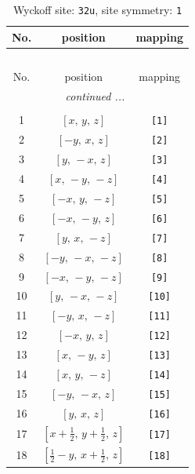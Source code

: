 \documentclass[fleqn,8pt]{jsarticle}
\begin{document}
\renewcommand{\arraystretch}{1.2}
\begin{longtable}{ccc}
\caption{Wyckoff site: {\tt 32u}, site symmetry: {\tt 1}}
 \\
 \hline \hline
No. & position & mapping \\ \hline \endfirsthead

\multicolumn{2}{l}{\tablename\ \thetable{}} \\
 \hline \hline
No. & position & mapping \\ \hline \endhead

 \hline \hline
\multicolumn{2}{r}{\footnotesize\it continued ...} \\ \endfoot

 \hline \hline
\multicolumn{2}{r}{} \\ \endlastfoot

1 & $\left[ x,\, y,\, z \right]$ & {\tt [1]} \\ \hline
2 & $\left[ - y,\, x,\, z \right]$ & {\tt [2]} \\ \hline
3 & $\left[ y,\, - x,\, z \right]$ & {\tt [3]} \\ \hline
4 & $\left[ x,\, - y,\, - z \right]$ & {\tt [4]} \\ \hline
5 & $\left[ - x,\, y,\, - z \right]$ & {\tt [5]} \\ \hline
6 & $\left[ - x,\, - y,\, z \right]$ & {\tt [6]} \\ \hline
7 & $\left[ y,\, x,\, - z \right]$ & {\tt [7]} \\ \hline
8 & $\left[ - y,\, - x,\, - z \right]$ & {\tt [8]} \\ \hline
9 & $\left[ - x,\, - y,\, - z \right]$ & {\tt [9]} \\ \hline
10 & $\left[ y,\, - x,\, - z \right]$ & {\tt [10]} \\ \hline
11 & $\left[ - y,\, x,\, - z \right]$ & {\tt [11]} \\ \hline
12 & $\left[ - x,\, y,\, z \right]$ & {\tt [12]} \\ \hline
13 & $\left[ x,\, - y,\, z \right]$ & {\tt [13]} \\ \hline
14 & $\left[ x,\, y,\, - z \right]$ & {\tt [14]} \\ \hline
15 & $\left[ - y,\, - x,\, z \right]$ & {\tt [15]} \\ \hline
16 & $\left[ y,\, x,\, z \right]$ & {\tt [16]} \\ \hline
17 & $\left[ x + \frac{1}{2},\, y + \frac{1}{2},\, z \right]$ & {\tt [17]} \\ \hline
18 & $\left[ \frac{1}{2} - y,\, x + \frac{1}{2},\, z \right]$ & {\tt [18]} \\ \hline

\end{longtable}
\end{document}
